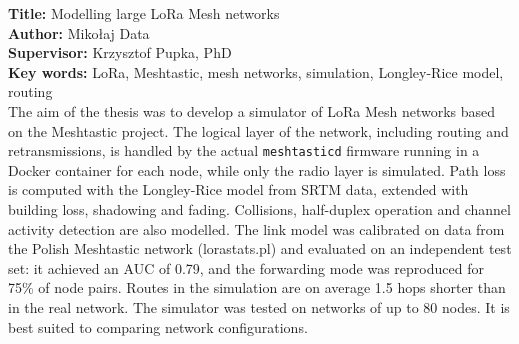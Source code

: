 \textbf{Title:} Modelling large LoRa Mesh networks\\
\textbf{Author:} Mikołaj Data \\
\textbf{Supervisor:} Krzysztof Pupka, PhD \\ %

\textbf{Key words:} LoRa, Meshtastic, mesh networks, simulation, Longley-Rice model, routing
\\

The aim of the thesis was to develop a simulator of LoRa Mesh networks based on the Meshtastic project. The logical layer of the network, including routing and retransmissions, is handled by the actual \texttt{meshtasticd} firmware running in a Docker container for each node, while only the radio layer is simulated. Path loss is computed with the Longley-Rice model from SRTM data, extended with building loss, shadowing and fading. Collisions, half-duplex operation and channel activity detection are also modelled. The link model was calibrated on data from the Polish Meshtastic network (lorastats.pl) and evaluated on an independent test set: it achieved an AUC of 0.79, and the forwarding mode was reproduced for 75\% of node pairs. Routes in the simulation are on average 1.5 hops shorter than in the real network. The simulator was tested on networks of up to 80 nodes. It is best suited to comparing network configurations.

\vfill

